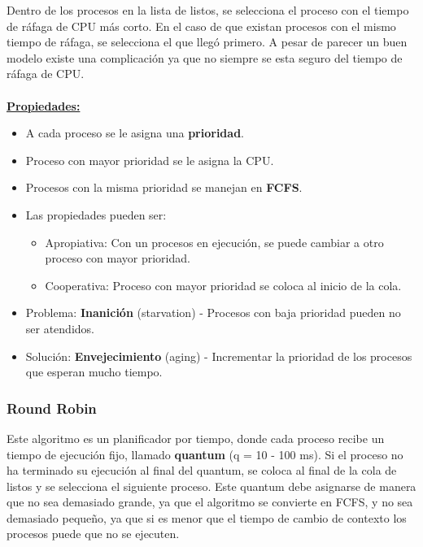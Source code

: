 \documentclass{templateNote}
\begin{document}
Dentro de los procesos en la lista de listos, se selecciona el proceso con el tiempo de ráfaga de CPU más corto. En el caso de que existan procesos con el mismo tiempo de ráfaga, se selecciona el que llegó primero. A pesar de parecer un buen modelo existe una complicación ya que no siempre se esta seguro del tiempo de ráfaga de CPU.
\\\\
\noindent\underline{\textbf{Propiedades:}}
\begin{itemize}
    \item A cada proceso se le asigna una \textbf{prioridad}.
    \item Proceso con mayor prioridad se le asigna la CPU.
    \item Procesos con la misma prioridad se manejan en \textbf{FCFS}.
    \item Las propiedades pueden ser:
    \begin{itemize}
        \item Apropiativa: Con un procesos en ejecución, se puede cambiar a otro proceso con mayor prioridad.
        \item Cooperativa: Proceso con mayor prioridad se coloca al inicio de la cola.
    \end{itemize}
    \item Problema: \textbf{Inanición} (starvation) - Procesos con baja prioridad pueden no ser atendidos.
    \item Solución: \textbf{Envejecimiento} (aging) - Incrementar la prioridad de los procesos que esperan mucho tiempo.
\end{itemize}

\subsubsection*{Round Robin}
Este algoritmo es un planificador por tiempo, donde cada proceso recibe un tiempo de ejecución fijo, llamado \textbf{quantum} (q = 10 - 100 ms). Si el proceso no ha terminado su ejecución al final del quantum, se coloca al final de la cola de listos y se selecciona el siguiente proceso.
Este quantum debe asignarse de manera que no sea demasiado grande, ya que el algoritmo se convierte en FCFS, y no sea demasiado pequeño, ya que si es menor que el tiempo de cambio de contexto los procesos puede que no se ejecuten.
\end{document}
